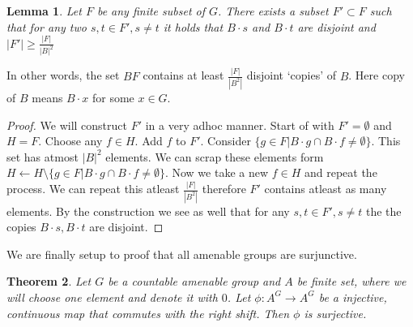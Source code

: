 \documentclass[titlepage, a4paper]{article}
\newcommand{\card}[1]{\left| #1 \right|}
\newtheorem{theorem}{Theorem}[section]
\newtheorem{lemma}[theorem]{Lemma}
\theoremstyle{remark}
\begin{document}
\begin{lemma}\label{lem:copies_of_B}
	Let $F$ be any finite subset of $G$. There exists a subset $F' \subset F$ such that for any two  $s,t \in F', s\ne t$ it holds that $B\cdot s$ and  $B\cdot t$ are disjoint and $\card{F'} \ge \frac{\card{F}}{\card{B}^2} $
\end{lemma}
In other words, the set  $BF$ contains at least $\frac{\card{F}}{\card{B^2}}$ disjoint `copies' of $B$. Here copy of $B$ means $B\cdot x$ for some $x \in G$.
\begin{proof}
We will construct $F'$ in a very adhoc manner. 
Start of with $F' = \emptyset$ and $H = F$. Choose any  $f \in H$. Add $f$ to $F'$. Consider $\{g \in F | B\cdot g \cap B\cdot f \ne \emptyset\} $. This set has atmost $\card{B}^2$ elements. 
We can scrap these elements form $H \leftarrow H \setminus \{g \in F | B\cdot g \cap B\cdot f \ne \emptyset\}$. Now we take a new  $f \in H$ and repeat the process.
We can repeat this atleast $\frac{\card{F}}{\card{B^2}}$ therefore $F'$ contains atleast as many elements. 
By the construction we see as well that for any $s, t \in F', s\ne t$ the the copies  $B\cdot s, B\cdot t$  are disjoint.
\end{proof}

We are finally setup to proof that all amenable groups are surjunctive.
\begin{theorem}
	Let $G$ be a countable amenable group and  $A$ be finite set, where we will choose one element and denote it with $0$. Let  $\phi: A^{G} \to A^{G}$ be a injective, continuous map that commutes with the right shift. Then $\phi$ is surjective.
\end{theorem}
\end{document}
